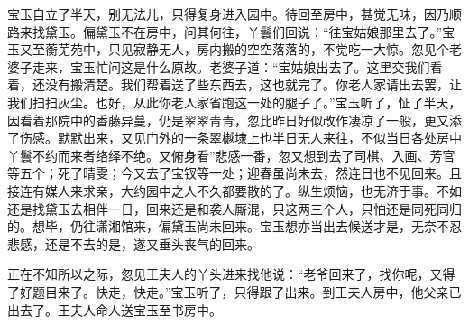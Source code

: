 宝玉自立了半天，别无法儿，只得复身进入园中。待回至房中，甚觉无味，因乃顺路来找黛玉。偏黛玉不在房中，问其何往，丫鬟们回说：``往宝姑娘那里去了。''宝玉又至蘅芜苑中，只见寂静无人，房内搬的空空落落的，不觉吃一大惊。忽见个老婆子走来，宝玉忙问这是什么原故。老婆子道：``宝姑娘出去了。这里交我们看着，还没有搬清楚。我们帮着送了些东西去，这也就完了。你老人家请出去罢，让我们扫扫灰尘。也好，从此你老人家省跑这一处的腿子了。''宝玉听了，怔了半天，因看着那院中的香藤异蔓，仍是翠翠青青，忽比昨日好似改作凄凉了一般，更又添了伤感。默默出来，又见门外的一条翠樾埭上也半日无人来往，不似当日各处房中丫鬟不约而来者络绎不绝。又俯身看''悲感一番，忽又想到去了司棋、入画、芳官等五个；死了晴雯；今又去了宝钗等一处；迎春虽尚未去，然连日也不见回来。且接连有媒人来求亲，大约园中之人不久都要散的了。纵生烦恼，也无济于事。不如还是找黛玉去相伴一日，回来还是和袭人厮混，只这两三个人，只怕还是同死同归的。想毕，仍往潇湘馆来，偏黛玉尚未回来。宝玉想亦当出去候送才是，无奈不忍悲感，还是不去的是，遂又垂头丧气的回来。

正在不知所以之际，忽见王夫人的丫头进来找他说：``老爷回来了，找你呢，又得了好题目来了。快走，快走。''宝玉听了，只得跟了出来。到王夫人房中，他父亲已出去了。王夫人命人送宝玉至书房中。


